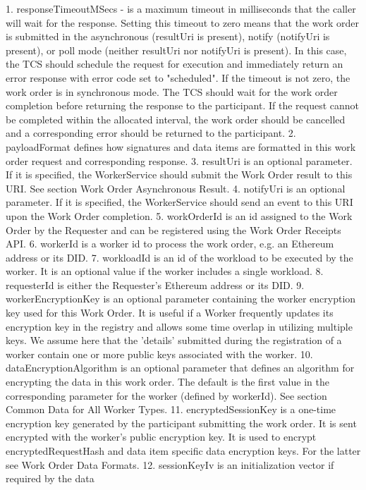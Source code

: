 \begin{DoxyVerb}
1. responseTimeoutMSecs - is a maximum timeout in milliseconds that
the caller will wait for the response. Setting this timeout to zero
means that the work order is submitted in the asynchronous (resultUri
is present), notify (notifyUri is present), or poll mode (neither
resultUri nor notifyUri is present). In this case, the TCS should
schedule the request for execution and immediately return an error
response with error code set to "scheduled". If the timeout is not
zero, the work order is in synchronous mode. The TCS should wait for
the work order completion before returning the response to the
participant. If the request cannot be completed within the allocated
interval, the work order should be cancelled and a corresponding error
should be returned to the participant.
2. payloadFormat defines how signatures and data items are formatted in
this work order request and corresponding response.
3. resultUri is an optional parameter. If it is specified, the
WorkerService should submit the Work Order result to this URI.
See section Work Order Asynchronous Result.
4. notifyUri is an optional parameter. If it is specified, the
WorkerService should send an event to this URI upon the Work Order
completion.
5. workOrderId is an id assigned to the Work Order by the Requester
and can be registered using the Work Order Receipts API.
6. workerId is a worker id to process the work order,
e.g. an Ethereum address or its DID.
7. workloadId is an id of the workload to be executed by the worker.
It is an optional value if the worker includes a single workload.
8. requesterId is either the Requester’s Ethereum address or its DID.
9. workerEncryptionKey is an optional parameter containing the worker
encryption key used for this Work Order. It is useful if a Worker
frequently updates its encryption key in the registry and allows some
time overlap in utilizing multiple keys.
We assume here that the 'details' submitted during the registration of
a worker contain one or more public keys associated with the worker.
10. dataEncryptionAlgorithm is an optional parameter that defines an
algorithm for encrypting the data in this work order. The default is
the first value in the corresponding parameter for the worker
(defined by workerId). See section Common Data for All Worker Types.
11. encryptedSessionKey is a one-time encryption key generated by the
participant submitting the work order. It is sent encrypted with the
worker's public encryption key. It is used to encrypt
encryptedRequestHash and data item specific data encryption keys.
For the latter see Work Order Data Formats.
12. sessionKeyIv is an initialization vector if required by the data

\end{DoxyVerb}
